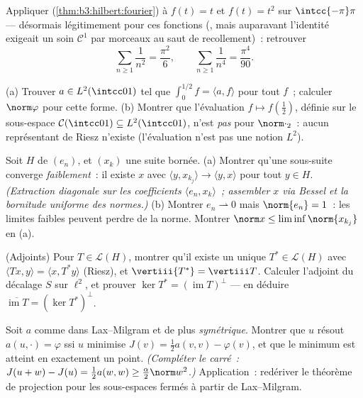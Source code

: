 \begin{exercise}[$\star\star$]\label{exo:b3:hilbert:5}
Appliquer  (\cref{thm:b3:hilbert:fourier}) à $f(t) =
t$ et $f(t) = t^2$ sur $\intcc{-\pi}\pi$ --- désormais
légitimement pour ces fonctions (, mais auparavant
l'identité exigeait un soin $\mathcal C^1$ par morceaux au
saut de recollement)~: retrouver
\[
\sum_{n\geq1}\frac1{n^2} = \frac{\pi^2}6,
\qquad
\sum_{n\geq1}\frac1{n^4} = \frac{\pi^4}{90} .
\]
\end{exercise}

\begin{exercise}[$\star\star$]\label{exo:b3:hilbert:6}
(a) Trouver $a \in L^2(\intcc01)$ tel que $\int_0^{1/2}f =
\langle a, f\rangle$ pour tout $f$~; calculer $\norm\varphi$
pour cette forme.
(b) Montrer que l'évaluation $f \mapsto f(\frac12)$, définie
sur le sous-espace $\mathcal C(\intcc01) \subseteq
L^2(\intcc01)$, n'est \emph{pas}  pour
$\norm\cdot_2$~: aucun représentant de Riesz n'existe
(l'évaluation n'est pas une notion $L^2$).
\end{exercise}

\begin{exercise}[$\star\star\star$]\label{exo:b3:hilbert:7}
Soit $H$  de  $(e_n)$, et $(x_k)$ une
suite bornée.
(a) Montrer qu'une sous-suite converge \emph{faiblement}~: il
existe $x$ avec $\langle y, x_{k_j}\rangle \to \langle y,
x\rangle$ pour tout $y \in H$. \emph{(Extraction diagonale
sur les coefficients $\langle e_n, x_k\rangle$~; assembler $x$
via Bessel et la bornitude uniforme des normes.)}
(b) Montrer $e_n \rightharpoonup 0$ mais $\norm{e_n} = 1$~:
les limites faibles peuvent perdre de la norme. Montrer
$\norm x \leq \liminf\norm{x_{k_j}}$ en (a).
\end{exercise}

\begin{exercise}[$\star\star$]\label{exo:b3:hilbert:8}
(Adjoints) Pour $T \in \mathcal L(H)$, montrer qu'il existe un
unique $T^* \in \mathcal L(H)$ avec $\langle Tx, y\rangle =
\langle x, T^*y\rangle$ (Riesz), et $\vertiii{T^*} =
\vertiii T$. Calculer l'adjoint du décalage $S$ sur $\ell^2$,
et prouver $\ker T^* = (\operatorname{im}T)^\perp$ --- en
déduire $\overline{\operatorname{im}T} = (\ker T^*)^\perp$.
\end{exercise}

\begin{exercise}[$\star\star$]\label{exo:b3:hilbert:9}
Soit $a$ comme dans Lax--Milgram et de plus \emph{symétrique}.
Montrer que $u$ résout $a(u, \cdot) = \varphi$ ssi $u$
minimise $J(v) = \frac12a(v, v) - \varphi(v)$, et que le
minimum est atteint en exactement un point. \emph{(Compléter
le carré~: $J(u + w) - J(u) = \frac12a(w,w) \geq
\frac\alpha2\norm w^2$.)} Application~: redériver le théorème
de projection pour les sous-espaces fermés à partir de
Lax--Milgram.
\end{exercise}

